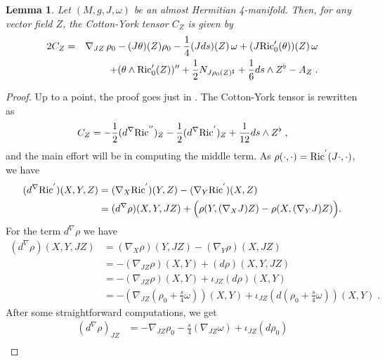 \documentclass{amsart}
\newtheorem{lemma}[theorem]{Lemma}
\newcommand{\na}{\nabla}
\begin{document}
\begin{lemma} \label{lemma-CY-AH} Let $(M, g, J,\omega)$  be an almost Hermitian 4-manifold. Then, for any vector field $Z$, the
Cotton-York tensor $C_Z$ is given by
\begin{eqnarray} \label{cotton-york}
2C_Z &= &\nabla_{JZ} \, \rho_0 - (J\theta)(Z) \rho_0 -\frac{1}{4}(Jds)(Z) \, \omega +(J{\rm Ric}_0'(\theta))(Z) \, \omega \\ \nonumber 
& & +(\theta \wedge {\rm Ric}_0'(Z))'' + \frac{1}{2} N_{J\rho_0(Z)^\sharp}
 + \frac{1}{6} ds \wedge Z^{\flat} - A_Z \; .
\end{eqnarray}
\end{lemma}
\begin{proof}
Up to a point, the proof goes just in \cite{AAD}. The Cotton-York tensor is rewritten as
\begin{equation}\label{basicpart}
C_Z = - \frac{1}{2} (d^{\na}{\rm Ric}^{''})_Z - \frac{1}{2} (d^{\na}
{\rm Ric}^{'})_Z + \frac{1}{12} ds\wedge Z^{\flat} \; ,
\end{equation}
and the main effort will be in computing the middle term.
As $\rho(\cdot, \cdot) = {\rm Ric}^{'} (J\cdot, \cdot)$, we have
\begin{equation} \label{dricinv} \begin{split}
 (d^{\na} {\rm Ric}^{'})(X, Y, Z) &= (\nabla _X {\rm Ric}^{'})(Y, Z) -  (\nabla
_Y {\rm Ric}^{'}) (X, Z) \\ &= (d^{\na} \rho)(X,Y,JZ) + \Big(
\rho(Y, (\na_X J)Z) - \rho(X, (\na_Y J)Z) \Big) .
\end{split} \end{equation}
For the term $d^{\na} \rho$ we have
\begin{equation} \nonumber \begin{split}
(d^{\na} \rho)(X,Y,JZ) &= (\na_X \rho)(Y,JZ) - (\na_Y \rho)(X,JZ)
\\ &= - (\na_{JZ} \rho)(X,Y) + (d\rho)(X,Y,JZ) \\
&= - (\na_{JZ} \rho)(X,Y) + \iota_{JZ}(d\rho)(X,Y) \\
&= - (\na_{JZ} (\rho_0 +\frac{s}{4} \omega)) (X, Y) +  \iota_{JZ}(d (\rho_0 + \frac{s}{4} \omega))(X,Y) \;.
\end{split} \end{equation}
After some straightforward computations, we get
\begin{equation} \nonumber \begin{split}
(d^{\na} \rho)_{JZ} &= - \nabla_{JZ} \rho_0 - \frac{s}{4} (\nabla_{JZ} \omega) + \iota_{JZ} (d \rho_0) \\

\end{split}
\end{equation}
\end{proof}
\end{document}
